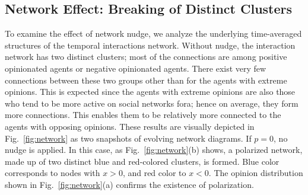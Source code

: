 \subsection{Network Effect: Breaking of Distinct Clusters}
To examine the effect of network nudge, we analyze the underlying time-averaged structures of the temporal interactions network. Without nudge, the interaction network has two distinct clusters; most of the connections are among positive opinionated agents or negative opinionated agents. There exist very few connections between these two groups other than for the agents with extreme opinions.
This is expected since the agents with extreme opinions are also those who tend to be more active on social networks fora; hence on average, they form more connections. This enables them to be relatively more connected to the agents with opposing opinions. These results are visually depicted in Fig.~\ref{fig:network} as two snapshots of evolving network diagrams. If $p=0$, no nudge is applied. In this case, as Fig.~\ref{fig:network}(b) shows, a polarized network, made up of two distinct blue and red-colored clusters, is formed. Blue color corresponds to nodes with $x > 0$, and red color to $x< 0$. The opinion distribution shown in Fig.~\ref{fig:network}(a) confirms the existence of polarization.

